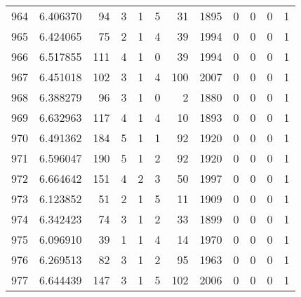 \begin{tabular}{lrrrrrrrrrrr}
964 &  6.406370 &   94 &      3 &        1 &      5 &              31 &  1895 &               0 &               0 &               0 &               1 \\
965 &  6.424065 &   75 &      2 &        1 &      4 &              39 &  1994 &               0 &               0 &               0 &               1 \\
966 &  6.517855 &  111 &      4 &        1 &      0 &              39 &  1994 &               0 &               0 &               0 &               1 \\
967 &  6.451018 &  102 &      3 &        1 &      4 &             100 &  2007 &               0 &               0 &               0 &               1 \\
968 &  6.388279 &   96 &      3 &        1 &      0 &               2 &  1880 &               0 &               0 &               0 &               1 \\
969 &  6.632963 &  117 &      4 &        1 &      4 &              10 &  1893 &               0 &               0 &               0 &               1 \\
970 &  6.491362 &  184 &      5 &        1 &      1 &              92 &  1920 &               0 &               0 &               0 &               1 \\
971 &  6.596047 &  190 &      5 &        1 &      2 &              92 &  1920 &               0 &               0 &               0 &               1 \\
972 &  6.664642 &  151 &      4 &        2 &      3 &              50 &  1997 &               0 &               0 &               0 &               1 \\
973 &  6.123852 &   51 &      2 &        1 &      5 &              11 &  1909 &               0 &               0 &               0 &               1 \\
974 &  6.342423 &   74 &      3 &        1 &      2 &              33 &  1899 &               0 &               0 &               0 &               1 \\
975 &  6.096910 &   39 &      1 &        1 &      4 &              14 &  1970 &               0 &               0 &               0 &               1 \\
976 &  6.269513 &   82 &      3 &        1 &      2 &              95 &  1963 &               0 &               0 &               0 &               1 \\
977 &  6.644439 &  147 &      3 &        1 &      5 &             102 &  2006 &               0 &               0 &               0 &               1 \\

\end{tabular}
